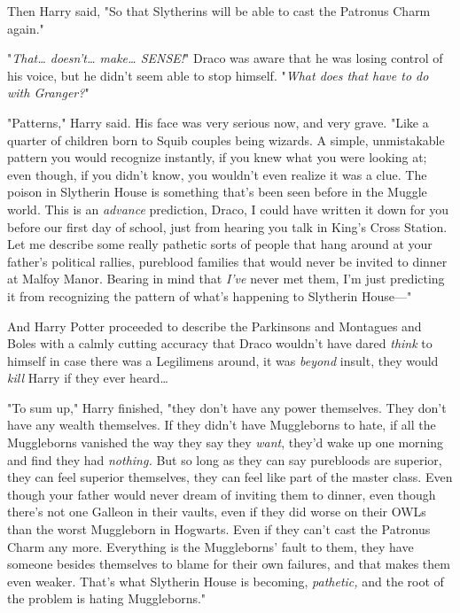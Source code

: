Then Harry said, "So that Slytherins will be able to cast the Patronus Charm 
again."

"\emph{That{\ldots} doesn't{\ldots} make{\ldots} SENSE!}" Draco was aware that 
he was losing control of his voice, but he didn't seem able to stop himself. 
"\emph{What does that have to do with Granger?}"

"Patterns," Harry said. His face was very serious now, and very grave. "Like a 
quarter of children born to Squib couples being wizards. A simple, unmistakable 
pattern you would recognize instantly, if you knew what you were looking at; 
even though, if you didn't know, you wouldn't even realize it was a clue. The 
poison in Slytherin House is something that's been seen before in the Muggle 
world. This is an \emph{advance} prediction, Draco, I could have written it 
down for you before our first day of school, just from hearing you talk in 
King's Cross Station. Let me describe some really pathetic sorts of people that 
hang around at your father's political rallies, pureblood families that would 
never be invited to dinner at Malfoy Manor. Bearing in mind that \emph{I've} 
never met them, I'm just predicting it from recognizing the pattern of what's 
happening to Slytherin House---"

And Harry Potter proceeded to describe the Parkinsons and Montagues and Boles 
with a calmly cutting accuracy that Draco wouldn't have dared \emph{think} to 
himself in case there was a Legilimens around, it was \emph{beyond} insult, 
they would \emph{kill} Harry if they ever heard{\ldots}

"To sum up," Harry finished, "they don't have any power themselves. They don't 
have any wealth themselves. If they didn't have Muggleborns to hate, if all the 
Muggleborns vanished the way they say they \emph{want}, they'd wake up one 
morning and find they had \emph{nothing.} But so long as they can say 
purebloods are superior, they can feel superior themselves, they can feel like 
part of the master class. Even though your father would never dream of inviting 
them to dinner, even though there's not one Galleon in their vaults, even if 
they did worse on their OWLs than the worst Muggleborn in Hogwarts. Even if 
they can't cast the Patronus Charm any more. Everything is the Muggleborns' 
fault to them, they have someone besides themselves to blame for their own 
failures, and that makes them even weaker. That's what Slytherin House is 
becoming, \emph{pathetic,} and the root of the problem is hating Muggleborns."

